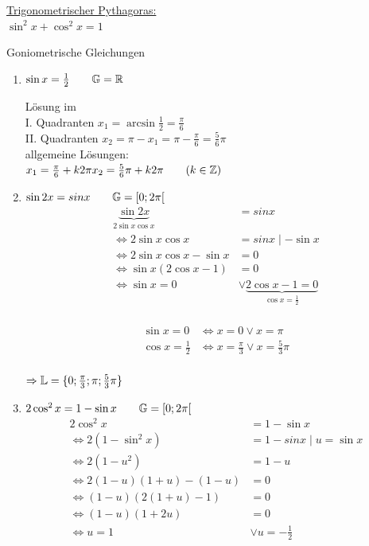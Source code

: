 \ul{Trigonometrischer Pythagoras:}\\
$\sin^2x + \cos^2x = 1$

\Bsps Goniometrische Gleichungen
\begin{enumerate}
	\item $\sin x = \frac{1}{2}\qquad \mathbb{G}=\mathbb{R}$
	
	Lösung im\\
	I. Quadranten $x_1=\arcsin\frac{1}{2} = \frac{\pi}{6}$\\
	II. Quadranten $x_2=\pi - x_1 = \pi - \frac{\pi}{6} = \frac{5}{6}\pi$\\
	allgemeine Lösungen:\\
	$x_1 = \frac{\pi}{6} + k2\pi\\
	x_2 = \frac{5}{6}\pi + k2\pi \qquad (k\in\mathbb{Z})$
	
	\item $\sin2x=sin x \qquad \mathbb{G}=[0;2\pi[$
	\begin{align*}
	\underbrace{\sin2x}_{2\sin x\cos x} &= sin x\\
	\Leftrightarrow 2\sin x\cos x &= sin x\mid-\sin x\\
	\Leftrightarrow 2\sin x\cos x -\sin x &= 0\\
	\Leftrightarrow \sin x(2\cos x -1) &= 0\\
	\Leftrightarrow \sin x = 0 &\lor \underbrace{2\cos x -1 = 0}_{\cos x=\frac{1}{2}}\\
	\end{align*}
	
	\begin{align*}
	\sin x = 0 &\Leftrightarrow x=0 \lor x = \pi\\
	\cos x = \frac{1}{2} &\Leftrightarrow x=\frac{\pi}{3} \lor x = \frac{5}{3}\pi\\
	\end{align*}
	
	$\Rightarrow \mathbb{L} = \{0;\frac{\pi}{3};\pi;\frac{5}{3}\pi\}$
	
	\item $2\cos^2x = 1-\sin x \qquad \mathbb{G}=[0;2\pi[$
	\begin{align*}
	2\cos^2x &= 1-\sin x\\
	\Leftrightarrow 2(1-\sin^2x) &= 1-sin x\mid u = \sin x\\
	\Leftrightarrow 2(1-u^2) &= 1-u\\
	\Leftrightarrow 2(1-u)(1+u)-(1-u) &= 0\\
	\Leftrightarrow (1-u)(2(1+u)-1) &= 0\\
	\Leftrightarrow (1-u)(1+2u) &= 0\\
	\Leftrightarrow u= 1 &\lor u=-\frac{1}{2}\\
	\end{align*}
	

\end{enumerate}
